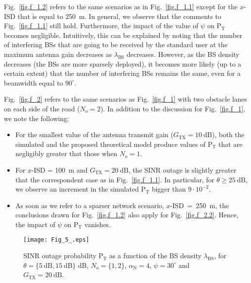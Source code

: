 \documentclass[10pt,journal,a4paper]{IEEEtran}
\begin{document}
Fig.~\ref{fig.f_1.2} refers to the same scenarios as in Fig.~\ref{fig.f_1.1} except for the $x$-ISD that is equal to \SI{250}{\metre}. In general, we observe that the comments to Fig.~\ref{fig.f_1.1} still hold.
Furthermore, the impact of the value of $\psi$ on $\mathrm{P}_{\mathrm{T}}$ becomes negligible. Intuitively, this can be explained by noting that the number of interfering BSs that are going to be received by the standard user at the maximum antenna gain decreases as $\lambda_{\mathrm{BS}}$ decreases. However, as the BS density decreases (the BSs are more sparsely deployed), it becomes more likely (up to a certain extent) that the number of interfering BSs remains the same, even for a beamwidth equal to $90^\circ$.

Fig.~\ref{fig.f_2} refers to the same scenarios as Fig.~\ref{fig.f_1} with two obstacle lanes on each side of the road ($N_o = 2$). In addition to the discussion for Fig.~\ref{fig.f_1}, we note the following:
\begin{itemize}
\item For the smallest value of the antenna transmit gain ($G_{\mathrm{TX}} = \SI{10}{\dB}$), both the simulated and the proposed  theoretical model produce values of $\mathrm{P}_{\mathrm{T}}$ that are negligibly greater that those when $N_o = 1$.
\item For $x$-ISD = \SI{100}{\meter} and $G_{\mathrm{TX}} = \SI{20}{\dB}$, the SINR outage is slightly greater that the correspondent case as in Fig.~\ref{fig.f_1.1}. In particular, for $\theta \geq \SI{25}{\dB}$, we observe an increment in the simulated $\mathrm{P}_{\mathrm{T}}$ bigger than $9 \cdot 10^{-2}$.
\item As soon as we refer to a sparser network scenario, \mbox{$x$-ISD = \SI{250}{\meter}}, the conclusions drawn for Fig.~\ref{fig.f_1.2} also apply for Fig.~\ref{fig.f_2.2}. Hence, the impact of $\psi$ on $\mathrm{P}_{\mathrm{T}}$ vanishes. 
\end{itemize}

\begin{figure}[t]
\vspace{-3mm}
\centering
\texttt{[image: Fig\_5\_.eps]}
\caption{SINR outage probability $\mathrm{P}_{\mathrm{T}}$ as a function of the BS density $\lambda_\mathrm{BS}$, for $\theta = \{\SI{5}{\dB},\SI{15}{\dB}\}$ dB, $N_o = \{1, 2\}$, $\alpha_\mathrm{N} = 4$, $\psi = 30^\circ$ and \mbox{$G_{\mathrm{TX}} = \SI{20}{\dB}$}.}
\label{fig.f_4}
\vspace{-3mm}
\end{figure}
\end{document}
